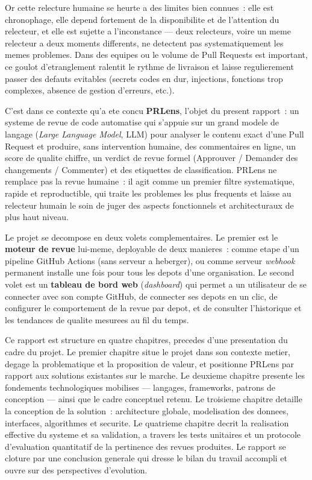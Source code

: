 \documentclass[a4paper,12pt,oneside]{report}
\begin{document}
Or cette relecture humaine se heurte a des limites bien connues~: elle est chronophage, elle depend fortement de la disponibilite et de l'attention du relecteur, et elle est sujette a l'inconstance --- deux relecteurs, voire un meme relecteur a deux moments differents, ne detectent pas systematiquement les memes problemes. Dans des equipes ou le volume de Pull Requests est important, ce goulot d'etranglement ralentit le rythme de livraison et laisse regulierement passer des defauts evitables (secrets codes en dur, injections, fonctions trop complexes, absence de gestion d'erreurs, etc.).

C'est dans ce contexte qu'a ete concu \textbf{PRLens}, l'objet du present rapport~: un systeme de revue de code automatise qui s'appuie sur un grand modele de langage (\emph{Large Language Model}, LLM) pour analyser le contenu exact d'une Pull Request et produire, sans intervention humaine, des commentaires en ligne, un score de qualite chiffre, un verdict de revue formel (Approuver / Demander des changements / Commenter) et des etiquettes de classification. PRLens ne remplace pas la revue humaine~: il agit comme un premier filtre systematique, rapide et reproductible, qui traite les problemes les plus frequents et laisse au relecteur humain le soin de juger des aspects fonctionnels et architecturaux de plus haut niveau.

Le projet se decompose en deux volets complementaires. Le premier est le \textbf{moteur de revue} lui-meme, deployable de deux manieres~: comme etape d'un pipeline GitHub Actions (sans serveur a heberger), ou comme serveur \emph{webhook} permanent installe une fois pour tous les depots d'une organisation. Le second volet est un \textbf{tableau de bord web} (\emph{dashboard}) qui permet a un utilisateur de se connecter avec son compte GitHub, de connecter ses depots en un clic, de configurer le comportement de la revue par depot, et de consulter l'historique et les tendances de qualite mesurees au fil du temps.

Ce rapport est structure en quatre chapitres, precedes d'une presentation du cadre du projet. Le premier chapitre situe le projet dans son contexte metier, degage la problematique et la proposition de valeur, et positionne PRLens par rapport aux solutions existantes sur le marche. Le deuxieme chapitre presente les fondements technologiques mobilises --- langages, frameworks, patrons de conception --- ainsi que le cadre conceptuel retenu. Le troisieme chapitre detaille la conception de la solution~: architecture globale, modelisation des donnees, interfaces, algorithmes et securite. Le quatrieme chapitre decrit la realisation effective du systeme et sa validation, a travers les tests unitaires et un protocole d'evaluation quantitatif de la pertinence des revues produites. Le rapport se cloture par une conclusion generale qui dresse le bilan du travail accompli et ouvre sur des perspectives d'evolution.
\end{document}

